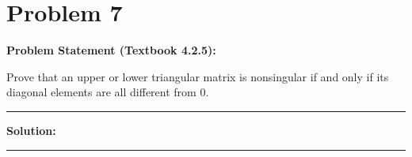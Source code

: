\clearpage
\section*{Problem 7}

\textbf{Problem Statement (Textbook 4.2.5):} 

Prove that an upper or lower triangular matrix is nonsingular if and only if its diagonal elements are all different from $0$.

\noindent\rule{\textwidth}{0.4pt}

\vspace{1em}

\textbf{Solution:}


\vspace{2em}
\noindent\rule{\textwidth}{0.4pt}
